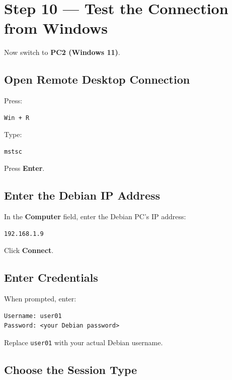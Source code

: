 \documentclass[a4paper,12pt]{article}
\newcommand{\code}[1]{\texttt{\small #1}}
\begin{document}
\section{Step 10 --- Test the Connection from Windows}

Now switch to \textbf{PC2 (Windows 11)}.

\subsection{Open Remote Desktop Connection}

Press:

\begin{lstlisting}[style=textstyle]
Win + R
\end{lstlisting}

Type:

\begin{lstlisting}[style=textstyle]
mstsc
\end{lstlisting}

Press \textbf{Enter}.

\subsection{Enter the Debian IP Address}

In the \textbf{Computer} field, enter the Debian PC's IP address:

\begin{lstlisting}[style=textstyle]
192.168.1.9
\end{lstlisting}

Click \textbf{Connect}.

\subsection{Enter Credentials}

When prompted, enter:

\begin{lstlisting}[style=textstyle]
Username: user01
Password: <your Debian password>
\end{lstlisting}

\begin{notebox}
Replace \code{user01} with your actual Debian username.
\end{notebox}

\subsection{Choose the Session Type}
\end{document}
